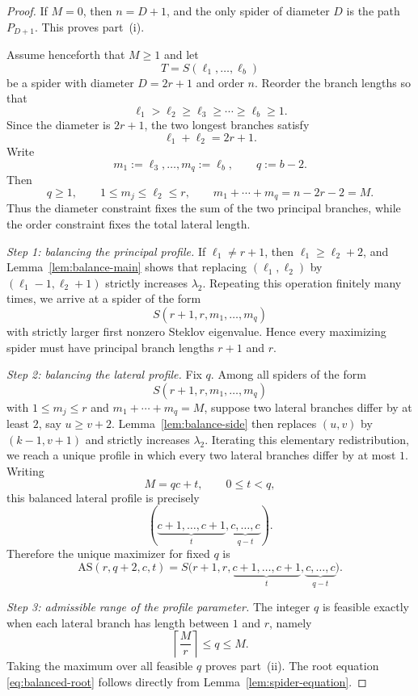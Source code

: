 \documentclass[11pt]{article}
\theoremstyle{remark}
\newcommand{\AS}{\mathrm{AS}}
\begin{document}
\begin{proof}
If $M=0$, then $n=D+1$, and the only spider of diameter $D$ is the path $P_{D+1}$.
This proves part~\textnormal{(i)}.

Assume henceforth that $M\ge1$ and let
$$
T=S(\ell_1,\dots,\ell_b)
$$
be a spider with diameter $D=2r+1$ and order $n$. Reorder the branch lengths so that
$$
\ell_1>\ell_2\ge \ell_3\ge \cdots \ge \ell_b\ge 1.
$$
Since the diameter is $2r+1$, the two longest branches satisfy
$$
\ell_1+\ell_2=2r+1.
$$
Write
$$
m_1:=\ell_3,\dots,m_q:=\ell_b,
\qquad q:=b-2.
$$
Then
$$
q\ge1,
\qquad
1\le m_j\le \ell_2\le r,
\qquad
m_1+\cdots+m_q=n-2r-2=M.
$$
Thus the diameter constraint fixes the sum of the two principal branches, while the order
constraint fixes the total lateral length.

\smallskip
\noindent\emph{Step 1: balancing the principal profile.}
If $\ell_1\neq r+1$, then $\ell_1\ge \ell_2+2$, and Lemma~\ref{lem:balance-main} shows that
replacing $(\ell_1,\ell_2)$ by $(\ell_1-1,\ell_2+1)$ strictly increases $\lambda_2$. Repeating this
operation finitely many times, we arrive at a spider of the form
$$
S(r+1,r,m_1,\dots,m_q)
$$
with strictly larger first nonzero Steklov eigenvalue. Hence every maximizing spider must have
principal branch lengths $r+1$ and $r$.

\smallskip
\noindent\emph{Step 2: balancing the lateral profile.}
Fix $q$. Among all spiders of the form
$$
S(r+1,r,m_1,\dots,m_q)
$$
with $1\le m_j\le r$ and $m_1+\cdots+m_q=M$, suppose two lateral branches differ by at least
$2$, say $u\ge v+2$. Lemma~\ref{lem:balance-side} then replaces $(u,v)$ by $(k-1,v+1)$ and
strictly increases $\lambda_2$. Iterating this elementary redistribution, we reach a unique profile in
which every two lateral branches differ by at most $1$. Writing
$$
M=qc+t,
\qquad 0\le t<q,
$$
this balanced lateral profile is precisely
$$
(\underbrace{c+1,\dots,c+1}_{t},\underbrace{c,\dots,c}_{q-t}).
$$
Therefore the unique maximizer for fixed $q$ is
$$
\AS(r,q+2,c,t)=S\bigl(r+1,r,\underbrace{c+1,\dots,c+1}_{t},\underbrace{c,\dots,c}_{q-t}\bigr).
$$

\smallskip
\noindent\emph{Step 3: admissible range of the profile parameter.}
The integer $q$ is feasible exactly when each lateral branch has length between $1$ and $r$, namely
$$
\left\lceil \frac{M}{r}\right\rceil\le q\le M.
$$
Taking the maximum over all feasible $q$ proves part~\textnormal{(ii)}. The root equation
\eqref{eq:balanced-root} follows directly from Lemma~\ref{lem:spider-equation}.
\end{proof}
\end{document}
